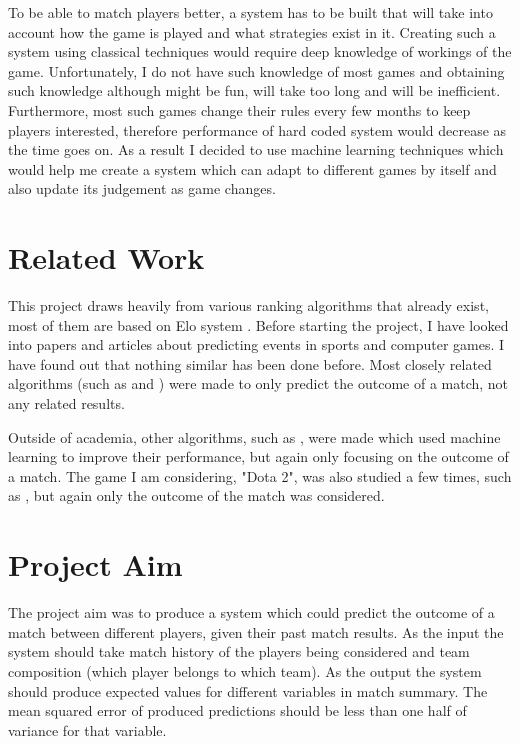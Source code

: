 \documentclass[12pt,a4paper]{book}
\begin{document}
To be able to match players better, a system has to be built that will take into account how the game is played and what strategies exist in it.
Creating such a system using classical techniques would require deep knowledge of workings of the game.
Unfortunately, I do not have such knowledge of most games and obtaining such knowledge although might be fun, will take too long and will be inefficient.
Furthermore, most such games change their rules every few months to keep players interested, therefore performance of hard coded system would decrease as the time goes on.
As a result I decided to use machine learning techniques which would help me create a system which can adapt to different games by itself and also update its judgement as game changes.

\section{Related Work}
This project draws heavily from various ranking algorithms that already exist, most of them are based on Elo system \cite{elo}.
Before starting the project, I have looked into papers and articles about predicting events in sports and computer games.
I have found out that nothing similar has been done before.
Most closely related algorithms (such as \cite{trueskill} and \cite{bayesianranking}) were made to only predict the outcome of a match, not any related results.

Outside of academia, other algorithms, such as \cite{datainformed}, were made which used machine learning to improve their performance, but again only focusing on the outcome of a match.
The game I am considering, "Dota 2", was also studied a few times, such as \cite{agarwala2014learning}, but again only the outcome of the match was considered.

\section{Project Aim}
The project aim was to produce a system which could predict the outcome of a match between different players, given their past match results.
As the input the system should take match history of the players being considered and team composition (which player belongs to which team).
As the output the system should produce expected values for different variables in match summary.
The mean squared error of produced predictions should be less than one half of variance for that variable.

\makeatother
\end{document}
